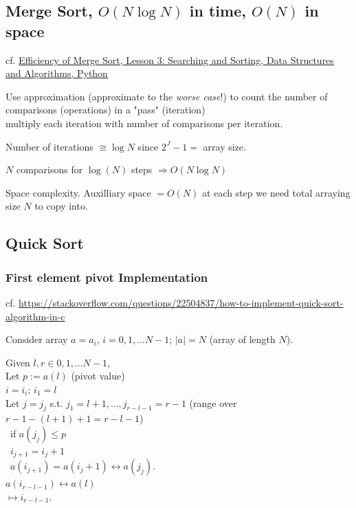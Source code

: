 \documentclass[10pt]{amsart}
\begin{document}
\subsection{Merge Sort, $O(N \log{N})$ in time, $O(N)$ in space}

cf. \href{https://classroom.udacity.com/courses/ud513/lessons/7123524086/concepts/71254347930923}{Efficiency of Merge Sort, Lesson 3: Searching and Sorting, Data Structures and Algorithms, Python}

Use approximation (approximate to the \emph{worse case}!) to count the number of comparisons (operations) in a "pass" (iteration) \\
multiply each iteration with number of comparisons per iteration.

Number of iterations $\cong \log{N}$ since $2^J - 1 = $ array size. 

$N$ comparisons for $\log{(N)}$ steps $\Longrightarrow O(N \log{N})$

Space complexity. Auxilliary space $=O(N)$ at each step we need total arraying size $N$ to copy into.

\subsection{Quick Sort}

\subsubsection{First element pivot Implementation}

cf. \url{https://stackoverflow.com/questions/22504837/how-to-implement-quick-sort-algorithm-in-c}

Consider array $a=a_i$, $i=0,1, \dots N-1$; $|a|=N$ (array of length $N$).

Given $l, r \in 0,1,\dots N-1$, \\
Let $p:= a(l)$ (pivot value) \\
$i=i_i$; $i_1=l$ \\
Let $j=j_j$ s.t. $j_1=l+1, \dots , j_{r-l-1} = r-1$ (range over $r-1 - (l+1)+1 = r-l-1$) \\
\qquad \, if $a(j_j) \leq p$ \\
\qquad \, \phantom{if} $i_{j+1} = i_j+1$ \\
\qquad \, \phantom{if} $a(i_{j+1}) = a(i_j+1) \leftrightarrow a(j_j)$. \\

$a(i_{r-l-1}) \leftrightarrow a(l)$ \\
$\mapsto i_{r-l-1}$.
\end{document}
